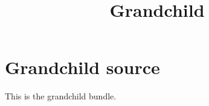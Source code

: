 \documentclass{article}
\title{Grandchild}
\begin{document}
\maketitle

\section{Grandchild source}

This is the grandchild bundle.
\end{document}
